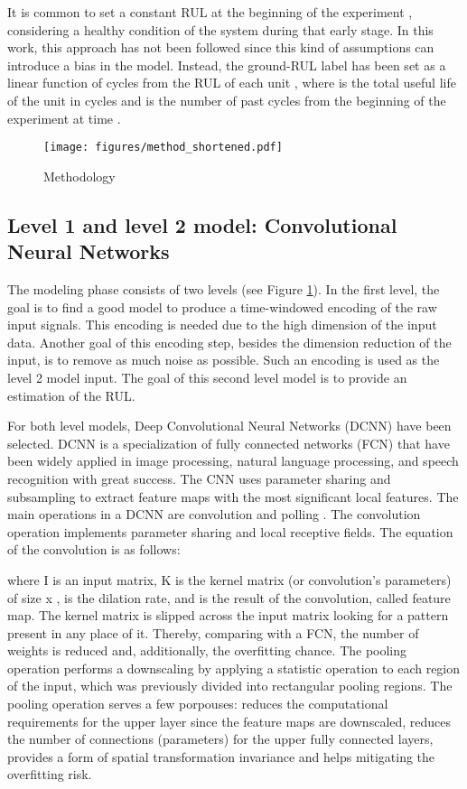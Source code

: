 \documentclass[PHM, 2021]{PHMSociety}
\begin{document}
It is common to set a constant RUL at the beginning of the experiment \cite{li2020remaining}, considering a healthy condition of the system during that early stage. In this work, this approach has not been followed since this kind of assumptions can introduce a bias in the model. Instead, the ground-RUL label has been set as a linear function of cycles from the RUL of each unit , where  is the total useful life of the unit  in cycles and  is the number of past cycles from the beginning of the experiment at time .

\begin{figure}[t]
\centering
\texttt{[image: figures/method\_shortened.pdf]}
\caption{Methodology}
\label{fig:method}
\end{figure}

\subsection{Level 1 and level 2 model: Convolutional Neural Networks}

The modeling phase consists of two levels (see Figure \ref{fig:method}). In the first level, the goal is to find a good model to produce a time-windowed encoding of the raw input signals. This encoding is needed due to the high dimension of the input data. Another goal of this encoding step, besides the dimension reduction of the input, is to remove as much noise as possible. Such an encoding is used as the level 2 model input. The goal of this second level model is to provide an estimation of the RUL. 



For both level models, Deep Convolutional Neural Networks (DCNN) have been selected. DCNN is a specialization of fully connected networks (FCN) that have been widely applied in image processing, natural language processing, and speech recognition with great success. The CNN uses parameter sharing and subsampling to extract feature maps with the most significant local features. The main operations in a DCNN are convolution and polling . The convolution operation implements parameter sharing and local receptive fields. The equation of the convolution is as follows:



where I is an input matrix, K is the kernel matrix (or convolution's parameters) of size  x ,  is the dilation rate, and  is the result of the convolution, called feature map. The kernel matrix is slipped across the input matrix looking for a pattern present in any place of it. Thereby, comparing with a FCN, the number of weights is reduced and, additionally, the overfitting chance. The pooling operation performs a downscaling by applying a statistic operation to each region of the input, which was previously divided into rectangular pooling regions. The pooling operation serves a few porpouses: reduces the computational requirements for the upper layer since the feature maps are downscaled, reduces the number of connections (parameters) for the upper fully connected layers, provides a form of spatial transformation invariance and helps mitigating the overfitting risk.
\end{document}
